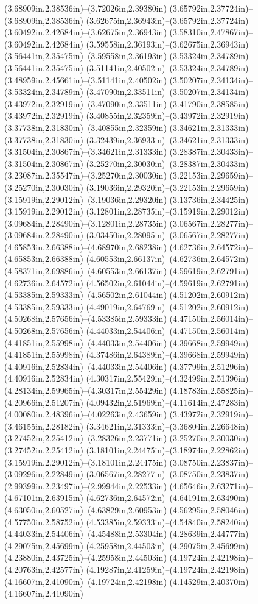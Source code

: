 (3.68909in,2.38536in)--(3.72026in,2.39380in) (3.65792in,2.37724in)--(3.68909in,2.38536in) (3.62675in,2.36943in)--(3.65792in,2.37724in) (3.60492in,2.42684in)--(3.62675in,2.36943in) (3.58310in,2.47867in)--(3.60492in,2.42684in) (3.59558in,2.36193in)--(3.62675in,2.36943in) (3.56441in,2.35475in)--(3.59558in,2.36193in) (3.53324in,2.34789in)--(3.56441in,2.35475in) (3.51141in,2.40502in)--(3.53324in,2.34789in) (3.48959in,2.45661in)--(3.51141in,2.40502in) (3.50207in,2.34134in)--(3.53324in,2.34789in) (3.47090in,2.33511in)--(3.50207in,2.34134in) (3.43972in,2.32919in)--(3.47090in,2.33511in) (3.41790in,2.38585in)--(3.43972in,2.32919in) (3.40855in,2.32359in)--(3.43972in,2.32919in) (3.37738in,2.31830in)--(3.40855in,2.32359in) (3.34621in,2.31333in)--(3.37738in,2.31830in) (3.32439in,2.36933in)--(3.34621in,2.31333in) (3.31504in,2.30867in)--(3.34621in,2.31333in) (3.28387in,2.30433in)--(3.31504in,2.30867in) (3.25270in,2.30030in)--(3.28387in,2.30433in) (3.23087in,2.35547in)--(3.25270in,2.30030in) (3.22153in,2.29659in)--(3.25270in,2.30030in) (3.19036in,2.29320in)--(3.22153in,2.29659in) (3.15919in,2.29012in)--(3.19036in,2.29320in) (3.13736in,2.34425in)--(3.15919in,2.29012in) (3.12801in,2.28735in)--(3.15919in,2.29012in) (3.09684in,2.28490in)--(3.12801in,2.28735in) (3.06567in,2.28277in)--(3.09684in,2.28490in) (3.03450in,2.28095in)--(3.06567in,2.28277in) (4.65853in,2.66388in)--(4.68970in,2.68238in) (4.62736in,2.64572in)--(4.65853in,2.66388in) (4.60553in,2.66137in)--(4.62736in,2.64572in) (4.58371in,2.69886in)--(4.60553in,2.66137in) (4.59619in,2.62791in)--(4.62736in,2.64572in) (4.56502in,2.61044in)--(4.59619in,2.62791in) (4.53385in,2.59333in)--(4.56502in,2.61044in) (4.51202in,2.60912in)--(4.53385in,2.59333in) (4.49019in,2.64769in)--(4.51202in,2.60912in) (4.50268in,2.57656in)--(4.53385in,2.59333in) (4.47150in,2.56014in)--(4.50268in,2.57656in) (4.44033in,2.54406in)--(4.47150in,2.56014in) (4.41851in,2.55998in)--(4.44033in,2.54406in) (4.39668in,2.59949in)--(4.41851in,2.55998in) (4.37486in,2.64389in)--(4.39668in,2.59949in) (4.40916in,2.52834in)--(4.44033in,2.54406in) (4.37799in,2.51296in)--(4.40916in,2.52834in) (4.30317in,2.55429in)--(4.32499in,2.51396in) (4.28134in,2.59965in)--(4.30317in,2.55429in) (4.18783in,2.55825in)--(4.20966in,2.51207in) (4.09432in,2.51969in)--(4.11614in,2.47283in) (4.00080in,2.48396in)--(4.02263in,2.43659in) (3.43972in,2.32919in)--(3.46155in,2.28182in) (3.34621in,2.31333in)--(3.36804in,2.26648in) (3.27452in,2.25412in)--(3.28326in,2.23771in) (3.25270in,2.30030in)--(3.27452in,2.25412in) (3.18101in,2.24475in)--(3.18974in,2.22862in) (3.15919in,2.29012in)--(3.18101in,2.24475in) (3.08750in,2.23837in)--(3.09296in,2.22849in) (3.06567in,2.28277in)--(3.08750in,2.23837in) (2.99399in,2.23497in)--(2.99944in,2.22533in) (4.65646in,2.63271in)--(4.67101in,2.63915in) (4.62736in,2.64572in)--(4.64191in,2.63490in) (4.63050in,2.60527in)--(4.63829in,2.60953in) (4.56295in,2.58046in)--(4.57750in,2.58752in) (4.53385in,2.59333in)--(4.54840in,2.58240in) (4.44033in,2.54406in)--(4.45488in,2.53304in) (4.28639in,2.44777in)--(4.29075in,2.45699in) (4.25958in,2.44503in)--(4.29075in,2.45699in) (4.23880in,2.43725in)--(4.25958in,2.44503in) (4.19724in,2.42198in)--(4.20763in,2.42577in) (4.19287in,2.41259in)--(4.19724in,2.42198in) (4.16607in,2.41090in)--(4.19724in,2.42198in) (4.14529in,2.40370in)--(4.16607in,2.41090in) 